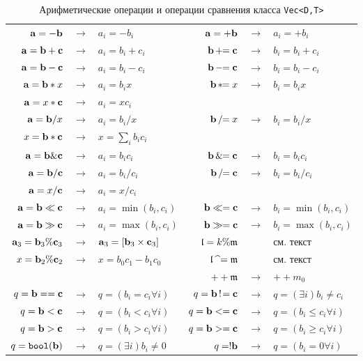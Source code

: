 \begin{table}
\begin{center}
\begin{tabular}{|rcl|rcl|}
\hline
$ \mathbf{a} = -\mathbf{b}$ &$\to$& $a_i = -b_i$ & $ \mathbf{a} = +\mathbf{b}$ &$\to$& $a_i = +b_i$ \\
$\mathbf{a}=\mathbf{b}+\mathbf{c}$ &$\to$& $a_i=b_i+c_i$  & $\mathbf{b}\,+\!\!=\mathbf{c}$ &$\to$& $b_i=b_i+c_i$  \\
$\mathbf{a}=\mathbf{b}-\mathbf{c}$ &$\to$& $a_i=b_i-c_i$  & $\mathbf{b}\,-\!\!=\mathbf{c}$ &$\to$& $b_i=b_i-c_i$  \\
$\mathbf{a}=\mathbf{b}\ast x$ &$\to$& $a_i=b_i  x$  & $\mathbf{b}\,\ast\!\!= x$ &$\to$& $b_i=b_i  x$  \\
$\mathbf{a}= x \ast \mathbf{c}$ &$\to$& $a_i= x  c_i$ &&&  \\
$\mathbf{a}=\mathbf{b}/ x$ &$\to$& $a_i=b_i/ x$ & $\mathbf{b}\,/\!\!= x$ &$\to$& $b_i=b_i/ x$  \\
$x = \mathbf{b} \ast \mathbf{c}$ &$\to$& $x = \sum_i b_i c_i$ &&&  \\
\hline
$\mathbf{a}=\mathbf{b}\&\mathbf{c}$ &$\to$& $a_i=b_i  c_i$  & $\mathbf{b}\,\&\!\!= \mathbf{c}$ &$\to$& $b_i=b_i  c_i$  \\
$\mathbf{a}=\mathbf{b}/\mathbf{c}$ &$\to$& $a_i=b_i/c_i$  & $\mathbf{b}\,/\!\!= \mathbf{c}$ &$\to$& $b_i=b_i/c_i$  \\
$\mathbf{a}= x/\mathbf{c}$ &$\to$& $a_i= x/c_i$ &&&  \\
\hline
$ \mathbf{a} = \mathbf{b} \ll \mathbf{c}$ &$\to$& $a_i = \min(b_i,c_i)$ & $ \mathbf{b} \ll= \mathbf{c}$ &$\to$& $b_i = \min(b_i,c_i)$\\
$ \mathbf{a} = \mathbf{b} \gg \mathbf{c}$ &$\to$& $a_i = \max(b_i,c_i)$ & $ \mathbf{b} \gg= \mathbf{c}$ &$\to$& $b_i = \max(b_i,c_i)$\\
\hline
$\mathbf{a}_3 = \mathbf{b}_3 \% \mathbf{c}_3$ &$\to$& $\mathbf{a}_3 = [\mathbf{b}_3 \times \mathbf{c}_3]$ &$\mathfrak{l}=k\%\mathfrak{m}$ && см. текст \\
$x = \mathbf{b}_2 \% \mathbf{c}_2$ &$\to$& $ x =  b_0c_1-b_1c_0$ & $\mathfrak{l}\,\,\widehat{~}\!=\mathfrak{m}$ && см. текст \\
&&& $++\mathfrak{m}$ &$\to$& $++m_0$\\
\hline
$ q = \mathbf{b} == \mathbf{c}$ &$\to$& $q = (b_i=c_i \forall i)$  & $ q = \mathbf{b} \,!\!= \mathbf{c}$ &$\to$& $q = (\exists i) b_i\neq c_i$  \\
$ q = \mathbf{b} < \mathbf{c}$ &$\to$& $q = (b_i<c_i \forall i)$ & $ q = \mathbf{b} <= \mathbf{c}$ &$\to$& $q = (b_i\leq c_i \forall i)$ \\
$ q = \mathbf{b} > \mathbf{c}$ &$\to$& $q = (b_i>c_i \forall i)$ & $ q = \mathbf{b} >= \mathbf{c}$ &$\to$& $q = (b_i\geq c_i \forall i)$   \\
$ q = {\tt bool}(\mathbf{b})$ &$\to$& $q = (\exists i) b_i\neq 0$  & $ q = !\mathbf{b}$ &$\to$& $q = (b_i=0 \forall i)$  \\
\hline
\end{tabular}
\end{center}
\caption{Арифметические операции и операции сравнения класса {\tt Vec<D,T>}}\label{vec:op:table}
\end{table}

